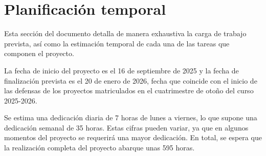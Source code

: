 \section{Planificación temporal}
Esta sección del documento detalla de manera exhaustiva la carga de trabajo prevista, 
así como la estimación temporal de cada una de las tareas que componen el proyecto.

La fecha de inicio del proyecto es el 16 de septiembre de 2025 y la fecha de finalización 
prevista es el 20 de enero de 2026, fecha que coincide con el inicio de las defensas de los 
proyectos matriculados en el cuatrimestre de otoño del curso 2025-2026.

Se estima una dedicación diaria de 7 horas de lunes a viernes, lo que supone una dedicación 
semanal de 35 horas. Estas cifras pueden variar, ya que en algunos momentos del proyecto se 
requerirá una mayor dedicación. En total, se espera que la realización completa del proyecto 
abarque unas 595 horas.




